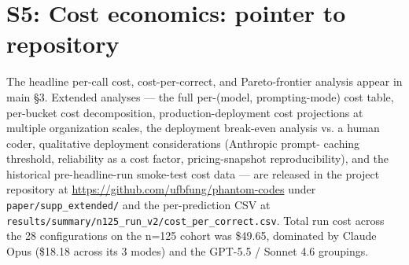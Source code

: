\section{S5: Cost economics: pointer to repository}\label{s5-cost-economics-extended-analysis}

The headline per-call cost, cost-per-correct, and Pareto-frontier
analysis appear in main §3. Extended analyses --- the full
per-(model, prompting-mode) cost table, per-bucket cost
decomposition, production-deployment cost projections at multiple
organization scales, the deployment break-even analysis vs. a human
coder, qualitative deployment considerations (Anthropic prompt-
caching threshold, reliability as a cost factor, pricing-snapshot
reproducibility), and the historical pre-headline-run smoke-test
cost data --- are released in the project repository at
\url{https://github.com/ufbfung/phantom-codes} under
\texttt{paper/supp\_extended/} and the per-prediction CSV at
\texttt{results/summary/n125\_run\_v2/cost\_per\_correct.csv}.
Total run cost across the 28 configurations on the n=125 cohort was
\$49.65, dominated by Claude Opus (\$18.18 across its 3 modes) and
the GPT-5.5 / Sonnet 4.6 groupings.
